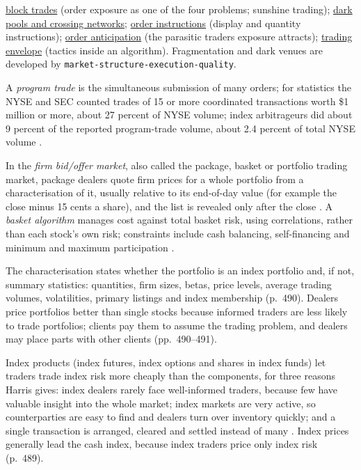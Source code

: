 \begin{qfdefinition}
 \hyperref[def:block-trade]{block trades} (order exposure as one of the four problems; sunshine trading); \hyperref[def:dark-pools-crossing]{dark pools and crossing networks}; \hyperref[def:order-instructions]{order instructions} (display and quantity instructions); \hyperref[def:order-anticipation]{order anticipation} (the parasitic traders exposure attracts); \hyperref[def:trading-envelope]{trading envelope} (tactics inside an algorithm). Fragmentation and dark venues are developed by \nolinkurl{market-structure-execution-quality}.

\end{qfdefinition}

\begin{qfdefinition}\label{def:portfolio-trading}
 A \emph{program trade} is the simultaneous submission of many orders; for statistics the NYSE and SEC counted trades of 15 or more coordinated transactions worth \$1 million or more, about 27 percent of NYSE volume; index arbitrageurs did about 9 percent of the reported program-trade volume, about 2.4 percent of total NYSE volume \citep[chap.~``Index and Portfolio Markets'', p.~489]{alpha-harris}.

In the \emph{firm bid/offer market}, also called the package, basket or portfolio trading market, package dealers quote firm prices for a whole portfolio from a characterisation of it, usually relative to its end-of-day value (for example the close minus 15 cents a share), and the list is revealed only after the close \citep[same chap., sec.~23.4.1, p.~490]{alpha-harris}. A \emph{basket algorithm} manages cost against total basket risk, using correlations, rather than each stock's own risk; constraints include cash balancing, self-financing and minimum and maximum participation \citep[chap.~1, pp.~18--19]{s7-kissellscience}.

 The characterisation states whether the portfolio is an index portfolio and, if not, summary statistics: quantities, firm sizes, betas, price levels, average trading volumes, volatilities, primary listings and index membership (p.~490). Dealers price portfolios better than single stocks because informed traders are less likely to trade portfolios; clients pay them to assume the trading problem, and dealers may place parts with other clients (pp.~490--491).

Index products (index futures, index options and shares in index funds) let traders trade index risk more cheaply than the components, for three reasons Harris gives: index dealers rarely face well-informed traders, because few have valuable insight into the whole market; index markets are very active, so counterparties are easy to find and dealers turn over inventory quickly; and a single transaction is arranged, cleared and settled instead of many \citep[same chap., p.~484 and sec.~23.4, p.~489]{alpha-harris}. Index prices generally lead the cash index, because index traders price only index risk (p.~489).


\end{qfdefinition}
